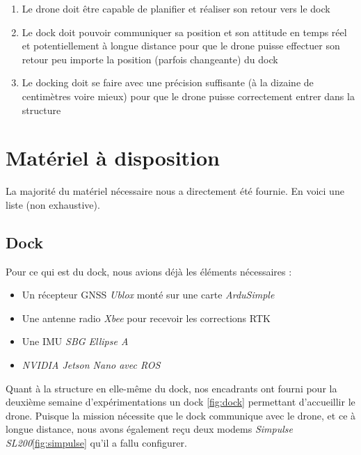 \documentclass[12pt]{report}
\begin{document}
\begin{enumerate}
    \item Le drone doit être capable de planifier et réaliser son retour vers le dock
    \item Le dock doit pouvoir communiquer sa position et son attitude en temps réel et potentiellement à longue distance pour que le drone puisse effectuer son retour peu importe la position (parfois changeante) du dock
    \item Le docking doit se faire avec une précision suffisante (à la dizaine de centimètres voire mieux) pour que le drone puisse correctement entrer dans la structure
\end{enumerate}

\section{Matériel à disposition}
La majorité du matériel nécessaire nous a directement été fournie. En voici une liste (non exhaustive).
\subsection{Dock}
Pour ce qui est du dock, nous avions déjà les éléments nécessaires :

\begin{itemize}
    \item Un récepteur GNSS \textit{Ublox} monté sur une carte \textit{ArduSimple}
    \item Une antenne radio \textit{Xbee} pour recevoir les corrections RTK
    \item Une IMU \textit{SBG Ellipse A}
    \item \textit{NVIDIA Jetson Nano avec ROS}
\end{itemize}

Quant à la structure en elle-même du dock, nos encadrants ont fourni pour la deuxième semaine d'expérimentations un dock \ref{fig:dock} permettant d'accueillir le drone.
Puisque la mission nécessite que le dock communique avec le drone, et ce à longue distance, nous avons également reçu deux modems \textit{Simpulse SL200}\ref{fig:simpulse} qu'il a fallu configurer.
\end{document}

